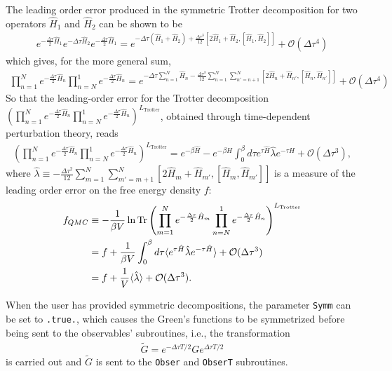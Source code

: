 The leading order error produced in the symmetric Trotter decomposition for two operators $\hat{H}_1 $ and $\hat{H}_2 $ can be shown to be
\begin{align}
e^{ -\frac{\Delta \tau}{2} \hat{H}_1 }  e^{  -\Delta \tau \hat{H}_2 }  e^{ - \frac{\Delta \tau}{2} \hat{H}_1 }
= e^{ -\Delta \tau (\hat{H}_1 + \hat{H}_2) + \frac{\Delta \tau^3}{12} [ 2 \hat{H}_1 + \hat{H}_2, [\hat{H}_1, \hat{H}_2  ] ] }  +  \mathcal{O} (\Delta \tau^4)
\end{align}
which gives, for the more general sum,
\begin{align}
\prod_{n=1}^{N}  e^{-\frac{\Delta \tau}{2} \hat{H}_n}      \prod_{n=N}^{1}  e^{-\frac{\Delta \tau}{2} \hat{H}_n}   
=   e^{- \Delta \tau \sum_{n=1}^N \hat{H}_n   - \frac{\Delta \tau^3}{12}  \sum_{n=1}^{N} \sum_{n'=n+1}^N  [ 2 \hat{H}_n + \hat{H}_{n'}, [\hat{H}_n, \hat{H}_{n'} ] ]  } 
+  \mathcal{O} (\Delta \tau^4 ) 
\end{align}
So that the leading-order error for the Trotter decomposition $ \left( \prod_{n=1}^{N}  e^{-\frac{\Delta \tau}{2} \hat{H}_n} \prod_{n=N}^{1}  e^{-\frac{\Delta \tau}{2} \hat{H}_n} \right)^{L_\text{Trotter}} $, obtained through time-dependent perturbation theory, reads
\begin{align}
\left( \prod_{n=1}^{N}  e^{-\frac{\Delta \tau}{2} \hat{H}_n}      \prod_{n=N}^{1}  e^{-\frac{\Delta \tau}{2} \hat{H}_n}  \right)^{L_\text{Trotter}}  
=  e^{- \beta \hat{H} } - e^{ -\beta \hat{H}} \int_0^{\beta}  d \tau  e^{\tau \hat{H}} \hat{\lambda}  e^{-\tau \hat{H}}   +  \mathcal{O} (\Delta \tau^3 ),
\end{align}
where $\hat{\lambda} \equiv -\frac{ \Delta \tau^2 }{12} \sum_{m=1}^N  \sum_{m'=m+1}^N  [2 \hat{H}_m + \hat{H}_{m'}, [\hat{H}_m , \hat{H}_{m'}] ] $  is a  measure of the leading order error on the free energy density $f$:
\begin{align}
f_{QMC} &\equiv  -\frac{1}{\beta V} \ln{ \mathop{\mathrm{Tr}}{  \left( \prod_{m=1}^{N}  e^{-\frac{\Delta \tau}{2} \hat{H}_m} \prod_{n=N}^{1}  e^{-\frac{\Delta \tau}{2} \hat{H}_n}  \right)^{L_\text{Trotter}}  } }      \\  
 & =  f + \frac{1}{\beta V} \int_0^{\beta} d\tau  
\langle  e^{\tau \hat{H}}  \hat{\lambda}  e^{- \tau \hat{H}} \rangle  + \mathcal{O} (\Delta \tau^3 ) \\  
 & = f + \frac{1}{ V }  \langle  \hat{\lambda}  \rangle  +  \mathcal{O} ( \Delta \tau^3 ).
\end{align}

When the user has provided symmetric decompositions, the parameter \texttt{Symm} can be set to \texttt{.true.}, which causes the Green's functions to be symmetrized before being sent to the observables' subroutines, i.e., the transformation
\begin{align}
\tilde{G} =  e^{-\Delta \tau T /2 } G e^{\Delta \tau T /2 }
\end{align}
is carried out and $ \tilde{G} $  is sent to the \texttt{Obser} and \texttt{ObserT} subroutines.

